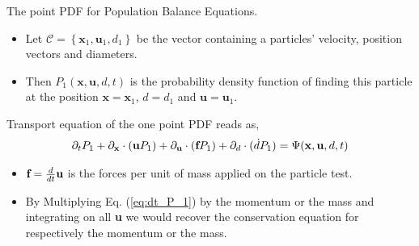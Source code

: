 \documentclass{sintefbeamer}
\begin{document}
\begin{frame}{The point PDF for Population Balance Equations.}
  \begin{definition}
    \begin{itemize}
      \item Let $\mathscr{C} =\left\{\textbf{x}_1,\textbf{u}_1,d_1\right\}$ be the vector containing a  particles' velocity, position vectors and diameters. 
      \item Then $P_1(\textbf{x},\textbf{u},d,t)$ is the probability density function of finding this particle at the position $\textbf{x} = \textbf{x}_1$, $d = d_1$ and $\textbf{u} = \textbf{u}_1$.  
    \end{itemize}
  \end{definition}
  Transport equation of the one point PDF reads as,
  \begin{equation}
    \partial_t P_1
    + \partial_{\textbf{x}} \cdot
    (\textbf{u}P_1)
    + \partial_{\textbf{u}} \cdot
    (\textbf{f}P_1)
    + \partial_{d} \cdot
    (\dot{d} P_1)
    = \Psi(\textbf{x},\textbf{u},d,t)
    \label{eq:dt_P_1}
\end{equation}

  \begin{itemize}
    \item $\textbf{f} = \frac{d}{dt} \textbf{u}$ is the forces per unit of mass applied on the particle test. 
    \item By Multiplying Eq. (\ref{eq:dt_P_1}) by the momentum or the mass and integrating on all \textbf{u} we would recover the conservation equation for respectively the momentum or the mass. 
  \end{itemize}
\end{frame}
\end{document}
